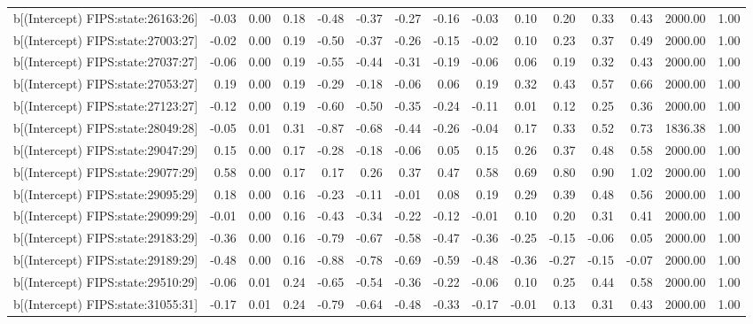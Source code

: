 \begin{table}[ht]
\begin{tabular}{rrrrrrrrrrrrrrr}
  b[(Intercept) FIPS:state:26163:26] & -0.03 & 0.00 & 0.18 & -0.48 & -0.37 & -0.27 & -0.16 & -0.03 & 0.10 & 0.20 & 0.33 & 0.43 & 2000.00 & 1.00 \\ 
  b[(Intercept) FIPS:state:27003:27] & -0.02 & 0.00 & 0.19 & -0.50 & -0.37 & -0.26 & -0.15 & -0.02 & 0.10 & 0.23 & 0.37 & 0.49 & 2000.00 & 1.00 \\ 
  b[(Intercept) FIPS:state:27037:27] & -0.06 & 0.00 & 0.19 & -0.55 & -0.44 & -0.31 & -0.19 & -0.06 & 0.06 & 0.19 & 0.32 & 0.43 & 2000.00 & 1.00 \\ 
  b[(Intercept) FIPS:state:27053:27] & 0.19 & 0.00 & 0.19 & -0.29 & -0.18 & -0.06 & 0.06 & 0.19 & 0.32 & 0.43 & 0.57 & 0.66 & 2000.00 & 1.00 \\ 
  b[(Intercept) FIPS:state:27123:27] & -0.12 & 0.00 & 0.19 & -0.60 & -0.50 & -0.35 & -0.24 & -0.11 & 0.01 & 0.12 & 0.25 & 0.36 & 2000.00 & 1.00 \\ 
  b[(Intercept) FIPS:state:28049:28] & -0.05 & 0.01 & 0.31 & -0.87 & -0.68 & -0.44 & -0.26 & -0.04 & 0.17 & 0.33 & 0.52 & 0.73 & 1836.38 & 1.00 \\ 
  b[(Intercept) FIPS:state:29047:29] & 0.15 & 0.00 & 0.17 & -0.28 & -0.18 & -0.06 & 0.05 & 0.15 & 0.26 & 0.37 & 0.48 & 0.58 & 2000.00 & 1.00 \\ 
  b[(Intercept) FIPS:state:29077:29] & 0.58 & 0.00 & 0.17 & 0.17 & 0.26 & 0.37 & 0.47 & 0.58 & 0.69 & 0.80 & 0.90 & 1.02 & 2000.00 & 1.00 \\ 
  b[(Intercept) FIPS:state:29095:29] & 0.18 & 0.00 & 0.16 & -0.23 & -0.11 & -0.01 & 0.08 & 0.19 & 0.29 & 0.39 & 0.48 & 0.56 & 2000.00 & 1.00 \\ 
  b[(Intercept) FIPS:state:29099:29] & -0.01 & 0.00 & 0.16 & -0.43 & -0.34 & -0.22 & -0.12 & -0.01 & 0.10 & 0.20 & 0.31 & 0.41 & 2000.00 & 1.00 \\ 
  b[(Intercept) FIPS:state:29183:29] & -0.36 & 0.00 & 0.16 & -0.79 & -0.67 & -0.58 & -0.47 & -0.36 & -0.25 & -0.15 & -0.06 & 0.05 & 2000.00 & 1.00 \\ 
  b[(Intercept) FIPS:state:29189:29] & -0.48 & 0.00 & 0.16 & -0.88 & -0.78 & -0.69 & -0.59 & -0.48 & -0.36 & -0.27 & -0.15 & -0.07 & 2000.00 & 1.00 \\ 
  b[(Intercept) FIPS:state:29510:29] & -0.06 & 0.01 & 0.24 & -0.65 & -0.54 & -0.36 & -0.22 & -0.06 & 0.10 & 0.25 & 0.44 & 0.58 & 2000.00 & 1.00 \\ 
  b[(Intercept) FIPS:state:31055:31] & -0.17 & 0.01 & 0.24 & -0.79 & -0.64 & -0.48 & -0.33 & -0.17 & -0.01 & 0.13 & 0.31 & 0.43 & 2000.00 & 1.00 \\ 

\end{tabular}
\end{table}
